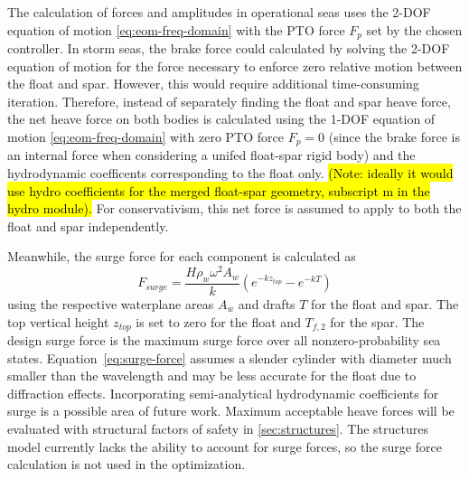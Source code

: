 The calculation of forces and amplitudes in operational seas uses the 2-DOF equation of motion \eqref{eq:eom-freq-domain} with the PTO force $F_p$ set by the chosen controller.
In storm seas, the brake force could calculated by solving the 2-DOF equation of motion for the force necessary to enforce zero relative motion between the float and spar.
However, this would require additional time-consuming iteration.
Therefore, instead of separately finding the float and spar heave force, the net heave force on both bodies is calculated using the 1-DOF equation of motion \eqref{eq:eom-freq-domain} with zero PTO force $F_p=0$ (since the brake force is an internal force when considering a unifed float-spar rigid body) and the hydrodynamic coefficents corresponding to the float only.
\hl{(Note: ideally it would use hydro coefficients for the merged float-spar geometry, subscript m in the hydro module).}
For conservativism, this net force is assumed to apply to both the float and spar independently. %

Meanwhile, the surge force for each component is calculated as \cite{newman_motions_1963}
\begin{equation}\label{eq:surge-force}
   F_{surge} = \frac{H\rho_w \omega^2 A_w}{k} (e^{-kz_{top}}-e^{-kT})
\end{equation}
using the respective waterplane areas $A_w$  and drafts $T$ for the float and spar.
The top vertical height $z_{top}$ is set to zero for the float and $T_{f,2}$ for the spar.
The design surge force is the maximum surge force over all nonzero-probability sea states.
Equation~\eqref{eq:surge-force} assumes a slender cylinder with diameter much smaller than the wavelength and may be less accurate for the float due to diffraction effects.
Incorporating semi-analytical hydrodynamic coefficients for surge is a possible area of future work. 
Maximum acceptable heave %
forces will be evaluated with structural factors of safety in \ref{sec:structures}.
The structures model currently lacks the ability to account for surge forces, so the surge force calculation is not used in the optimization.

